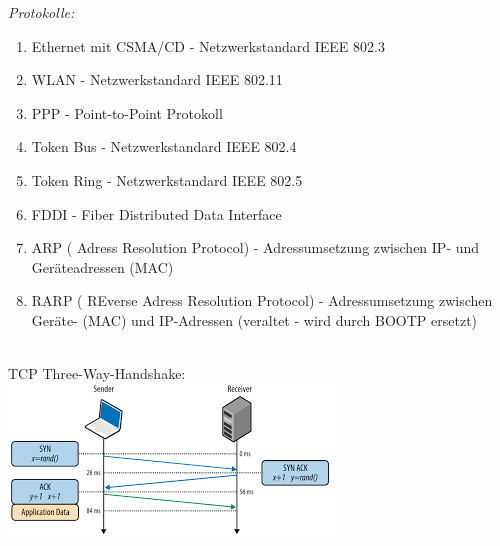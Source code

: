 \documentclass[11pt]{article}
\begin{document}
\begin{enumerate}
        \begin{addmargin}[1em]{1em}
            \emph{Protokolle:}\\

            \begin{enumerate}

                \item Ethernet mit CSMA/CD - Netzwerkstandard IEEE 802.3\\

                \item WLAN - Netzwerkstandard IEEE 802.11\\

                \item PPP - Point-to-Point Protokoll\\

                \item Token Bus - Netzwerkstandard IEEE 802.4\\

                \item Token Ring - Netzwerkstandard IEEE 802.5\\

                \item FDDI - Fiber Distributed Data Interface\\

                \item ARP ( Adress Resolution Protocol) - Adressumsetzung zwischen IP- und Geräteadressen (MAC)\\

                \item RARP ( REverse Adress Resolution Protocol) - Adressumsetzung zwischen Geräte- (MAC) und IP-Adressen
                (veraltet - wird durch BOOTP ersetzt)\\\\

            \end{enumerate}

        \end{addmargin}
    \end{enumerate}

    TCP Three-Way-Handshake:
    \includegraphics{images.png}
\end{document}

